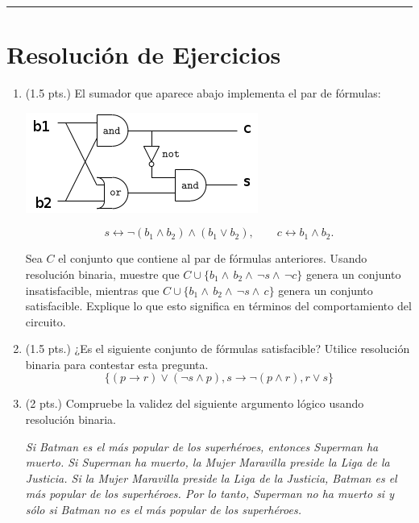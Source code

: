 \documentclass[12pt,letterpaper]{article}
\newcommand{\imp}{\rightarrow}
\begin{document}
\bigskip
\hrule height 0.1pt
\bigskip

\section*{Resolución de Ejercicios}

\begin{enumerate}
  
  \item (1.5 pts.) El sumador que aparece abajo implementa el par de fórmulas:
    \begin{multicols}{2}
      \begin{center}
	\includegraphics[scale=0.9]{circuit}
      \end{center}

      \[
      s \leftrightarrow \neg(b_1\wedge b_2)\wedge (b_1\vee b_2), \qquad c\leftrightarrow b_1\wedge b_2.
      \]
    \end{multicols}
Sea $C$ el conjunto que contiene al par de fórmulas anteriores. Usando resolución binaria, muestre que $C\cup\{b_1 \wedge\, b_2 \wedge\, \neg s \wedge\, \neg c\}$ genera un conjunto insatisfacible, mientras que $C\cup\{b_1 \wedge\, b_2 \wedge\, \neg s \wedge\, c\}$ genera un conjunto satisfacible. Explique lo que esto significa en términos del comportamiento del circuito.

\item (1.5 pts.) ¿Es el siguiente conjunto de fórmulas satisfacible? Utilice resolución binaria para contestar esta pregunta.
\[
\{
(p\imp r)\vee (\neg s\wedge p), s\imp\neg(p\wedge r), r\vee s
\}\]


\item (2 pts.) Compruebe la validez del siguiente argumento lógico usando resolución binaria.

{\it Si Batman es el más popular de los superhéroes, entonces Superman ha muerto. Si Superman ha muerto, la Mujer Maravilla preside la Liga de la Justicia. Si la Mujer Maravilla preside la Liga de la Justicia, Batman es el más popular de los superhéroes. Por lo tanto, Superman no ha muerto si y sólo si Batman no es el más popular de los superhéroes.}


\end{enumerate}
\end{document}
